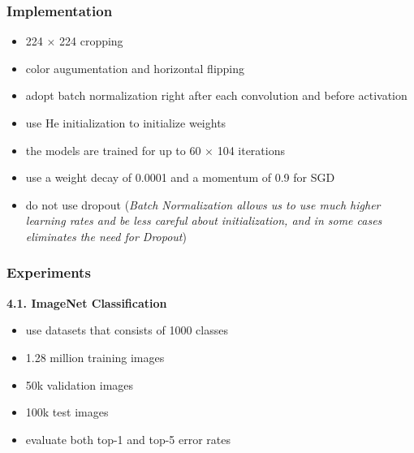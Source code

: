\documentclass[
	11pt, %
]{beamer}
\begin{document}
\begin{frame}
	\frametitle{Implementation}
	
	\begin{itemize}
		\item 224 × 224 cropping
		\item color augumentation and horizontal flipping
		\item adopt batch normalization right after each convolution and before activation
		\item use He initialization to initialize weights
		\item the models are trained for up to 60 × 104 iterations
		\item use a weight decay of 0.0001 and a momentum of 0.9 for SGD
		\item do not use dropout (\textit{Batch Normalization allows us to
use much higher learning rates and be less careful about initialization, and in some cases eliminates the need for Dropout})
	\end{itemize}
\end{frame}

\begin{frame}
	\frametitle{Experiments}

	\textbf{4.1. ImageNet Classification}

	\begin{itemize}
		\item use datasets that consists of 1000 classes
		\item 1.28 million training images
		\item 50k validation images
		\item 100k test images
		\item evaluate both top-1 and top-5 error rates
	\end{itemize}
\end{frame}
\end{document}
